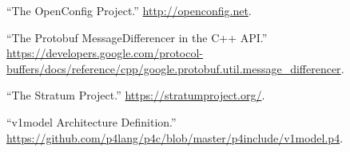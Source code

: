 \documentclass[11pt]{article}
\begin{document}
{{\begin{thebibliography}{39}
\mdbibitemlabel{{}[35]}\textquotedblleft{}The OpenConfig Project.\textquotedblright{} \href{http://openconfig.net}{{\ttfamily http://\hspace{0pt}openconfig.\hspace{0pt}net}}.\label{openconfig}%

\mdbibitemlabel{{}[36]}\textquotedblleft{}The Protobuf MessageDifferencer in the C++ API.\textquotedblright{} \href{https://developers.google.com/protocol-buffers/docs/reference/cpp/google.protobuf.util.message_differencer}{{\ttfamily https://\hspace{0pt}developers.\hspace{0pt}google.\hspace{0pt}com/\hspace{0pt}protocol-\hspace{0pt}buffers/\hspace{0pt}docs/\hspace{0pt}reference/\hspace{0pt}cpp/\hspace{0pt}google.\hspace{0pt}protobuf.\hspace{0pt}util.\hspace{0pt}message\_\hspace{0pt}differencer}}.\label{protomessagedifferencer}%

\mdbibitemlabel{{}[37]}\textquotedblleft{}The Stratum Project.\textquotedblright{} \href{https://stratumproject.org/}{{\ttfamily https://\hspace{0pt}stratumproject.\hspace{0pt}org/\hspace{0pt}}}.\label{stratum}%

\mdbibitemlabel{{}[38]}\textquotedblleft{}v1model Architecture Definition.\textquotedblright{} \href{https://github.com/p4lang/p4c/blob/master/p4include/v1model.p4}{{\ttfamily https://\hspace{0pt}github.\hspace{0pt}com/\hspace{0pt}p4lang/\hspace{0pt}p4c/\hspace{0pt}blob/\hspace{0pt}master/\hspace{0pt}p4include/\hspace{0pt}v1model.\hspace{0pt}p4}}.\label{v1model}%


\end{thebibliography}}}
\end{document}
